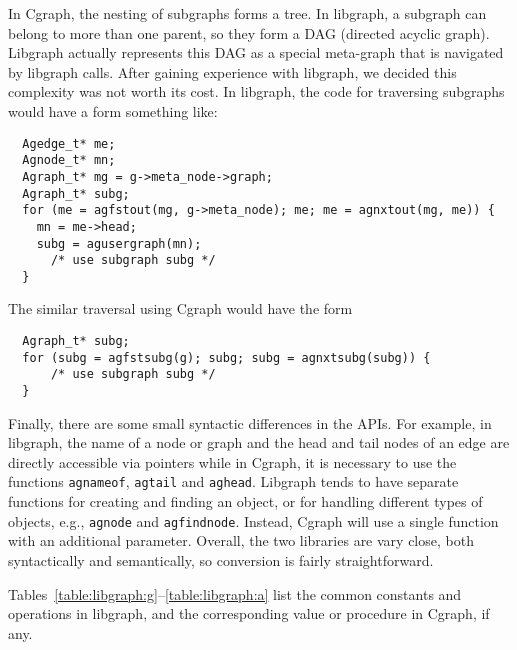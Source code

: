 \documentclass[11pt,letterpaper]{article}
\begin{document}
In Cgraph, the nesting of subgraphs forms a tree.
In libgraph, a subgraph can belong to more than one parent,
so they form a DAG (directed acyclic graph). Libgraph
actually represents this DAG as a special meta-graph
that is navigated by libgraph calls.  After gaining
experience with libgraph, we decided this complexity
was not worth its cost. In libgraph, the code for traversing
subgraphs would have a form something like\label{subg}:
\begin{verbatim}
  Agedge_t* me;
  Agnode_t* mn;
  Agraph_t* mg = g->meta_node->graph;
  Agraph_t* subg;
  for (me = agfstout(mg, g->meta_node); me; me = agnxtout(mg, me)) {
    mn = me->head;
    subg = agusergraph(mn);
      /* use subgraph subg */
  }
\end{verbatim}
The similar traversal using Cgraph would have the form
\begin{verbatim}
  Agraph_t* subg;
  for (subg = agfstsubg(g); subg; subg = agnxtsubg(subg)) {
      /* use subgraph subg */
  }
\end{verbatim}

Finally, there are some small syntactic differences in the APIs.
For example, in libgraph, the name of a node or graph and
the head and tail nodes of an edge are
directly accessible via pointers while in Cgraph, it is necessary to use
the functions \verb"agnameof", \verb"agtail" and \verb"aghead".
Libgraph tends to have separate functions for creating and finding
an object, or for handling different types of objects, e.g., 
\verb"agnode" and \verb"agfindnode". Instead, Cgraph will use a single function
with an additional parameter. Overall, the two libraries are vary close, both
syntactically and semantically, so conversion is fairly straightforward.

Tables~\ref{table:libgraph:g}--\ref{table:libgraph:a} list the common 
constants and operations in
libgraph, and the corresponding value or procedure in Cgraph, if any.
\end{document}
